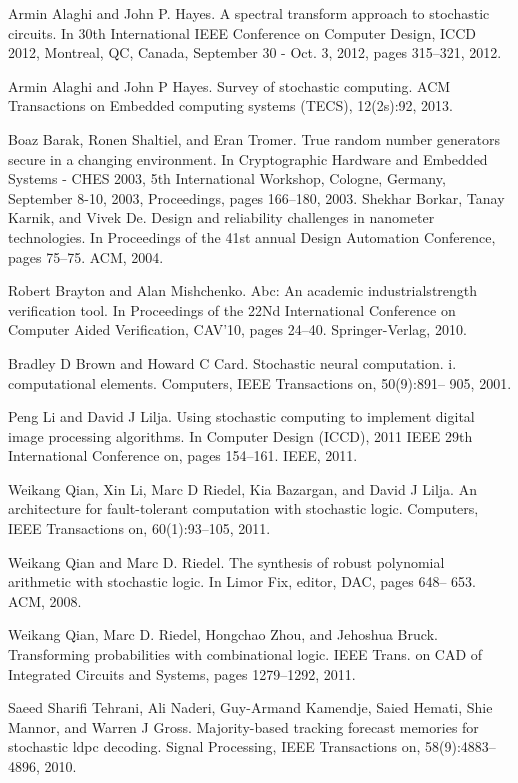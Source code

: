 \documentclass[10pt,conference]{IEEEtran}
\begin{document}
\begin{thebibliography}{}
 Armin Alaghi and John P. Hayes. A spectral transform approach to
stochastic circuits. In 30th International IEEE Conference on Computer
Design, ICCD 2012, Montreal, QC, Canada, September 30 - Oct. 3,
2012, pages 315–321, 2012.

 Armin Alaghi and John P Hayes. Survey of stochastic computing. ACM
Transactions on Embedded computing systems (TECS), 12(2s):92, 2013.

  Boaz Barak, Ronen Shaltiel, and Eran Tromer. True random number
generators secure in a changing environment. In Cryptographic Hardware
and Embedded Systems - CHES 2003, 5th International Workshop,
Cologne, Germany, September 8-10, 2003, Proceedings, pages 166–180,
2003.
  Shekhar Borkar, Tanay Karnik, and Vivek De. Design and reliability
challenges in nanometer technologies. In Proceedings of the 41st annual
Design Automation Conference, pages 75–75. ACM, 2004.

   Robert Brayton and Alan Mishchenko. Abc: An academic industrialstrength
verification tool. In Proceedings of the 22Nd International
Conference on Computer Aided Verification, CAV’10, pages 24–40.
Springer-Verlag, 2010.

 Bradley D Brown and Howard C Card. Stochastic neural computation. i.
computational elements. Computers, IEEE Transactions on, 50(9):891–
905, 2001.

  Peng Li and David J Lilja. Using stochastic computing to implement
digital image processing algorithms. In Computer Design (ICCD), 2011
IEEE 29th International Conference on, pages 154–161. IEEE, 2011.

  Weikang Qian, Xin Li, Marc D Riedel, Kia Bazargan, and David J
Lilja. An architecture for fault-tolerant computation with stochastic
logic. Computers, IEEE Transactions on, 60(1):93–105, 2011.

 Weikang Qian and Marc D. Riedel. The synthesis of robust polynomial
arithmetic with stochastic logic. In Limor Fix, editor, DAC, pages 648–
653. ACM, 2008.

  Weikang Qian, Marc D. Riedel, Hongchao Zhou, and Jehoshua Bruck.
Transforming probabilities with combinational logic. IEEE Trans. on
CAD of Integrated Circuits and Systems, pages 1279–1292, 2011.

 Saeed Sharifi Tehrani, Ali Naderi, Guy-Armand Kamendje, Saied
Hemati, Shie Mannor, and Warren J Gross. Majority-based tracking
forecast memories for stochastic ldpc decoding. Signal Processing, IEEE
Transactions on, 58(9):4883–4896, 2010.


\end{thebibliography}
\end{document}

